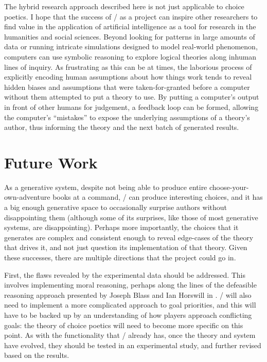 The hybrid research approach described here is not just applicable to choice poetics.
%
I hope that the success of \dunyazad/ as a project can inspire other researchers to find value in the application of artificial intelligence as a tool for research in the humanities and social sciences.
%
Beyond looking for patterns in large amounts of data or running intricate simulations designed to model real-world phenomenon, computers can use symbolic reasoning to explore logical theories along inhuman lines of inquiry.
%
As frustrating as this can be at times, the laborious process of explicitly encoding human assumptions about how things work tends to reveal hidden biases and assumptions that were taken-for-granted before a computer without them attempted to put a theory to use.
%
By putting a computer's output in front of other humans for judgement, a feedback loop can be formed, allowing the computer's ``mistakes'' to expose the underlying assumptions of a theory's author, thus informing the theory and the next batch of generated results.


\section{Future Work}

As a generative system, despite not being able to produce entire choose-your-own-adventure books at a command, \dunyazad/ can produce interesting choices, and it has a big enough generative space to occasionally surprise authors without disappointing them (although some of its surprises, like those of most generative systems, are disappointing).
%
Perhaps more importantly, the choices that it generates are complex and consistent enough to reveal edge-cases of the theory that drives it, and not just question its implementation of that theory.
%
Given these successes, there are multiple directions that the project could go in.


First, the flaws revealed by the experimental data should be addressed.
%
This involves implementing moral reasoning, perhaps along the lines of the defeasible reasoning approach presented by Joseph Blass and Ian Horswill in \citep{Blass2015}.
%
\dunyazad/ will also need to implement a more complicated approach to goal priorities, and this will have to be backed up by an understanding of how players approach conflicting goals: the theory of choice poetics will need to become more specific on this point.
%
As with the functionality that \dunyazad/ already has, once the theory and system have evolved, they should be tested in an experimental study, and further revised based on the results.


